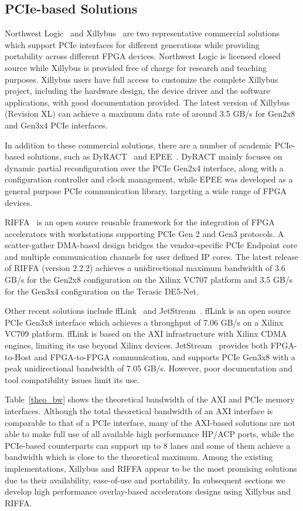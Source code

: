 \subsection{PCIe-based Solutions} 
Northwest Logic~\cite{nwlogic2018} and Xillybus~\cite{xillybus2018} are two representative commercial solutions which support PCIe interfaces for different generations while providing portability across different FPGA devices. 
Northwest Logic is licensed closed source while Xillybus is provided free of charge for research and teaching purposes. 
Xillybus users have full access to customize the complete Xillybus project, including the hardware design, the device driver and the software applications, with good documentation provided.
The latest version of Xillybus (Revision XL) can achieve a maximum data rate of around 3.5 GB/s for Gen2x8 and Gen3x4 PCIe interfaces.

In addition to these commercial solutions, there are a number of academic PCIe-based solutions, such as DyRACT~\cite{vipin2014dyract} and EPEE~\cite{gong2014efficient}.
DyRACT mainly focuses on dynamic partial reconfiguration over the PCIe Gen2x4 interface, along with a configuration controller and clock management, while EPEE was developed as a general purpose PCIe communication library, targeting a wide range of FPGA devices. 

RIFFA~\cite{jacobsen2015riffa} is an open source reusable framework for the integration of FPGA accelerators with workstations supporting PCIe Gen 2 and Gen3 protocols. 
A scatter-gather DMA-based design bridges the vendor-specific PCIe Endpoint core and multiple communication channels for user defined IP cores. 
The latest release of RIFFA (version 2.2.2) achieves a unidirectional maximum bandwidth of 3.6 GB/s for the Gen2x8 configuration on the Xilinx VC707 platform and 3.5 GB/s for the Gen3x4 configuration on the Terasic DE5-Net.

Other recent solutions include ffLink~\cite{de2016fflink} and JetStream~\cite{vesper2016jetstream}. 
ffLink is an open source PCIe Gen3x8 interface which achieves a throughput of 7.06 GB/s on a Xilinx VC709 platform. 
ffLink is based on the AXI infrastructure with Xilinx CDMA engines, limiting its use beyond Xilinx devices. 
JetStream~\cite{vesper2016jetstream} provides both FPGA-to-Host and FPGA-to-FPGA communication, and supports PCIe Gen3x8  with a peak unidirectional bandwidth of 7.05 GB/s. 
However, poor documentation and tool compatibility issues limit its use.

Table~\ref{theo_bw} shows the theoretical bandwidth of the AXI and PCIe memory interfaces. 
Although the total theoretical bandwidth of an AXI interface is comparable to that of a PCIe interface, many of the AXI-based solutions are not able to make full use of all available high performance HP/ACP ports, while the PCIe-based counterparts can support up to 8 lanes and some of them achieve a bandwidth which is close to the theoretical maximum. 
Among the existing implementations, Xillybus and RIFFA appear to be the most promising solutions due to their availability, ease-of-use and portability. 
In subsequent sections we develop high performance overlay-based accelerators designs using Xillybus and RIFFA.

